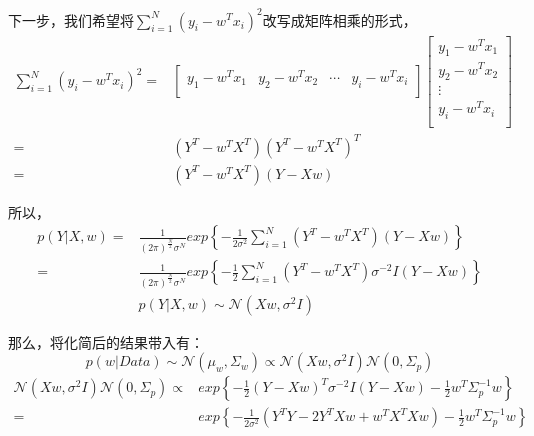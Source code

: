 \documentclass[a4paper]{article}
\begin{document}
下一步，我们希望将$\sum_{i=1}^N(y_i - w^Tx_i)^2$改写成矩阵相乘的形式，
\begin{equation}
    \begin{split}
        \sum_{i=1}^N(y_i - w^Tx_i)^2 = &
    \begin{bmatrix}
        y_1 - w^Tx_1 & y_2 - w^Tx_2 & \cdots & y_i - w^Tx_i \\
    \end{bmatrix}
    \begin{bmatrix}
        y_1 - w^Tx_1\\
        y_2 - w^Tx_2\\
        \vdots \\
        y_i - w^Tx_i \\
    \end{bmatrix} \\
    = & (Y^T - w^TX^T)(Y^T - w^TX^T)^T \\
    = & (Y^T - w^TX^T)(Y - Xw)
    \end{split}
\end{equation}

所以，
\begin{equation}
    \begin{split}
        p(Y|X,w) = &  \frac{1}{(2\pi)^{\frac{N}{2}}\sigma^N} exp\left\{ -\frac{1}{2\sigma^2}\sum_{i=1}^N(Y^T - w^TX^T)(Y - Xw) \right\} \\
        = &  \frac{1}{(2\pi)^{\frac{N}{2}}\sigma^N} exp\left\{ -\frac{1}{2}\sum_{i=1}^N(Y^T - w^TX^T)\sigma^{-2}I(Y - Xw) \right\} \\
        & p(Y|X,w) \sim \mathcal{N}(Xw,\sigma^2I)
    \end{split}
\end{equation}

那么，将化简后的结果带入有：
\begin{equation}
    p(w|Data) \sim \mathcal{N}(\mu_w,\Sigma_w) \propto \mathcal{N}(Xw,\sigma^2I) \mathcal{N}(0,\Sigma_p)
\end{equation}
\begin{equation}
    \begin{split}
        \mathcal{N}(Xw,\sigma^2I) \mathcal{N}(0,\Sigma_p) \propto & exp\left\{ -\frac{1}{2}(Y-Xw)^T\sigma^{-2}I(Y-Xw) - \frac{1}{2} w^T\Sigma_p^{-1}w \right\}\\
        = & exp\left\{ -\frac{1}{2\sigma^2}(Y^TY - 2Y^TXw + w^TX^TXw) - \frac{1}{2} w^T\Sigma_p^{-1}w \right\} \\
    \end{split}
\end{equation}
\end{document}
